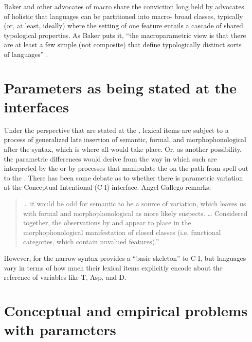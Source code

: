 \documentclass[output=paper,
modfonts
]{LSP/langsci}
\begin{document}
Baker and other advocates of macro share the conviction long
held by advocates of holistic  that languages can be partitioned
into macro- broad classes, typically (or, at least, ideally) where
the setting of one feature entails a cascade of shared typological
properties. As Baker puts it, ``the macroparametric view is that there
are at least a few simple (not composite)  that define
typologically distinct sorts of languages'' \citep[355]{baker2008}.

\section{Parameters as being stated at the interfaces}\label{sec:newmeyer:5}

Under the perspective that  are stated at the ,
lexical items are subject to a process of generalized late insertion of
semantic, formal, and morphophonological  after the syntax,
which is where all  would take place. Or, as another
possibility, the parametric differences would derive from the way in
which such  are interpreted by the  or by processes
that manipulate the  on the path from spell out to the
. There has been some debate as to whether there is parametric
variation at the Conceptual-Intentional (C-I) interface. Angel Gallego
remarks:

\begin{quote}
\ldots{} it would be odd for semantic  to be a source of
variation, which leaves us with formal and morphophonological 
as more likely suspects. \ldots{} Considered together, the observations
by \citet{chomsky2001b} and \citet{kayne2005,kayne2008} appear to place  in
the morphophonological manifestation of closed classes (i.e. functional
categories, which contain unvalued features).'' \citep[543--544]{gallego2011}
\end{quote}

However, for \citet{ramchand2008} the narrow syntax provides a
``basic skeleton'' to C-I, but languages vary in terms of how much their
lexical items explicitly encode about the reference of variables like T,
Asp, and D.

\section{Conceptual and empirical problems with parameters}\label{sec:newmeyer:6}
\end{document}
